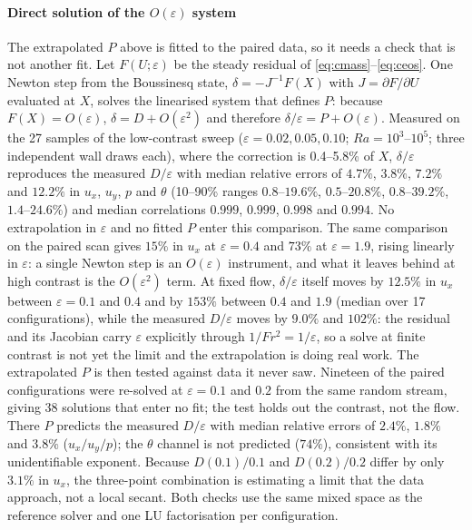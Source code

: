 \documentclass[preprint,11pt,a4paper,times,doubleblind]{elsarticle}
\begin{document}
\paragraph{Direct solution of the $O(\varepsilon)$ system} The extrapolated $P$ above is fitted to
the paired data, so it needs a check that is not another fit. Let $F(U;\varepsilon)$ be the steady
residual of \eqref{eq:cmass}--\eqref{eq:ceos}. One Newton step from the Boussinesq state,
$\delta=-J^{-1}F(X)$ with $J=\partial F/\partial U$ evaluated at $X$, solves the linearised system
that defines $P$: because $F(X)=O(\varepsilon)$, $\delta=D+O(\varepsilon^2)$ and therefore
$\delta/\varepsilon=P+O(\varepsilon)$. Measured on the 27 samples of the low-contrast sweep
($\varepsilon=0.02,0.05,0.10$; $Ra=10^3$--$10^5$; three independent wall draws each), where the correction is
0.4--5.8\% of $X$, $\delta/\varepsilon$ reproduces the measured $D/\varepsilon$ with median
relative errors of $4.7\%$, $3.8\%$, $7.2\%$ and $12.2\%$ in $u_x$, $u_y$, $p$ and $\theta$
(10--90\% ranges $0.8$--$19.6\%$, $0.5$--$20.8\%$, $0.8$--$39.2\%$, $1.4$--$24.6\%$) and median
correlations $0.999$, $0.999$, $0.998$ and $0.994$. No extrapolation in $\varepsilon$ and no
fitted $P$ enter this comparison. The same comparison on the paired scan gives $15\%$ in $u_x$ at
$\varepsilon=0.4$ and $73\%$ at $\varepsilon=1.9$, rising linearly in $\varepsilon$: a single
Newton step is an $O(\varepsilon)$ instrument, and what it leaves behind at high contrast is the
$O(\varepsilon^2)$ term. At fixed flow, $\delta/\varepsilon$ itself moves by $12.5\%$ in $u_x$
between $\varepsilon=0.1$ and $0.4$ and by $153\%$ between $0.4$ and $1.9$ (median over 17
configurations), while the measured $D/\varepsilon$ moves by $9.0\%$ and $102\%$: the residual
and its Jacobian carry $\varepsilon$ explicitly through $1/Fr^2=1/\varepsilon$, so a solve at
finite contrast is not yet the limit and the extrapolation is doing real work.
The extrapolated $P$ is then tested against data it never saw. Nineteen of the paired
configurations were re-solved at $\varepsilon=0.1$ and $0.2$ from the same random stream, giving
38 solutions that enter no fit; the test holds out the contrast, not the flow. There $P$ predicts the measured $D/\varepsilon$ with median
relative errors of $2.4\%$, $1.8\%$ and $3.8\%$
($u_x/u_y/p$); the $\theta$ channel is not predicted ($74\%$), consistent with its unidentifiable
exponent. Because $D(0.1)/0.1$ and $D(0.2)/0.2$ differ by only $3.1\%$ in $u_x$, the three-point
combination is estimating a limit that the data approach, not a local secant. Both checks use the
same mixed space as the reference solver and one LU factorisation per configuration.
\end{document}
